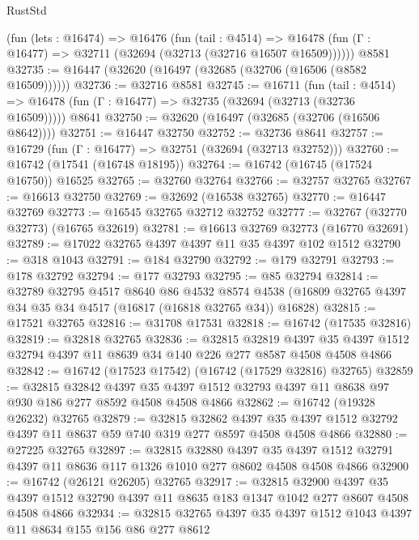 \begin{lexlean}{RustStd}
\begin{coremodule}
    (fun (lets : @16474) =>
    @16476
      (fun (tail : @4514) =>
      @16478 (fun (Γ : @16477) => @32711 (@32694 (@32713 (@32716 @16507 @16509))))))
    @8581
@32735 := @16447 (@32620 (@16497 (@32685 (@32706 (@16506 (@8582 @16509))))))
@32736 := @32716 @8581
@32745 := @16711
    (fun (tail : @4514) => @16478 (fun (Γ : @16477) => @32735 (@32694 (@32713 (@32736 @16509)))))
    @8641
@32750 := @32620 (@16497 (@32685 (@32706 (@16506 @8642))))
@32751 := @16447 @32750
@32752 := @32736 @8641
@32757 := @16729 (fun (Γ : @16477) => @32751 (@32694 (@32713 @32752)))
@32760 := @16742 (@17541 (@16748 @18195))
@32764 := @16742 (@16745 (@17524 @16750)) @16525
@32765 := @32760 @32764
@32766 := @32757 @32765
@32767 := @16613 @32750
@32769 := @32692 (@16538 @32765)
@32770 := @16447 @32769
@32773 := @16545 @32765 @32712 @32752
@32777 := @32767 (@32770 @32773) (@16765 @32619)
@32781 := @16613 @32769 @32773 (@16770 @32691)
@32789 := @17022 @32765 @4397 @4397 @11 @35 @4397 @102 @1512
@32790 := @318 @1043
@32791 := @184 @32790
@32792 := @179 @32791
@32793 := @178 @32792
@32794 := @177 @32793
@32795 := @85 @32794
@32814 := @32789
    @32795
    @4517
    @8640
    @86
    @4532
    @8574
    @4538
    (@16809 @32765 @4397 @34 @35 @34 @4517 (@16817 (@16818 @32765 @34)) @16828)
@32815 := @17521 @32765
@32816 := @31708 @17531
@32818 := @16742 (@17535 @32816)
@32819 := @32818 @32765
@32836 := @32815
    @32819
    @4397
    @35
    @4397
    @1512
    @32794
    @4397
    @11
    @8639
    @34
    @140
    @226
    @277
    @8587
    @4508
    @4508
    @4866
@32842 := @16742 (@17523 @17542) (@16742 (@17529 @32816) @32765)
@32859 := @32815
    @32842
    @4397
    @35
    @4397
    @1512
    @32793
    @4397
    @11
    @8638
    @97
    @930
    @186
    @277
    @8592
    @4508
    @4508
    @4866
@32862 := @16742 (@19328 @26232) @32765
@32879 := @32815
    @32862
    @4397
    @35
    @4397
    @1512
    @32792
    @4397
    @11
    @8637
    @59
    @740
    @319
    @277
    @8597
    @4508
    @4508
    @4866
@32880 := @27225 @32765
@32897 := @32815
    @32880
    @4397
    @35
    @4397
    @1512
    @32791
    @4397
    @11
    @8636
    @117
    @1326
    @1010
    @277
    @8602
    @4508
    @4508
    @4866
@32900 := @16742 (@26121 @26205) @32765
@32917 := @32815
    @32900
    @4397
    @35
    @4397
    @1512
    @32790
    @4397
    @11
    @8635
    @183
    @1347
    @1042
    @277
    @8607
    @4508
    @4508
    @4866
@32934 := @32815
    @32765
    @4397
    @35
    @4397
    @1512
    @1043
    @4397
    @11
    @8634
    @155
    @156
    @86
    @277
    @8612

\end{coremodule}
\end{lexlean}
